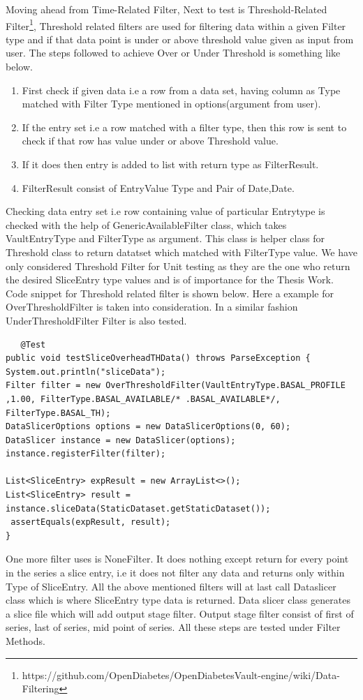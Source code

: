 \documentclass[article,type=msc,colorback,accentcolor=tud9c,twoside,11pt]{tudthesis}
\begin{document}
Moving ahead from Time-Related Filter, Next to test is Threshold-Related Filter\footnote{https://github.com/OpenDiabetes/OpenDiabetesVault-engine/wiki/Data-Filtering}, Threshold related filters are used for filtering data within a given Filter type and if that data point is under or above threshold value given as input from user. The steps followed to achieve Over or Under Threshold is something like below.
\begin{enumerate}
	\item First check if given data i.e a row from a data set, having column as Type matched with Filter Type mentioned in options(argument from user).
	\item If the entry set i.e a row matched with a filter type, then this row is sent to check if that row has value under or above Threshold value.
	\item If it does then entry is added to list with return type as FilterResult.
	\item FilterResult consist of EntryValue Type and Pair of Date,Date.
\end{enumerate}
Checking data entry set i.e row containing value of particular Entrytype is checked with the help of  GenericAvailableFilter class, which takes VaultEntryType and FilterType as argument. This class is helper class for Threshold class to return datatset which  matched with FilterType value. We have only considered Threshold Filter for Unit testing as they are the one who return the desired SliceEntry type values and is of importance for the Thesis Work. Code snippet for Threshold related filter is shown below. Here a example for OverThresholdFilter is taken into consideration. In a similar fashion UnderThresholdFilter Filter is also tested.
\begin{lstlisting}
   @Test
public void testSliceOverheadTHData() throws ParseException {
System.out.println("sliceData");     
Filter filter = new OverThresholdFilter(VaultEntryType.BASAL_PROFILE ,1.00, FilterType.BASAL_AVAILABLE/* .BASAL_AVAILABLE*/, FilterType.BASAL_TH);
DataSlicerOptions options = new DataSlicerOptions(0, 60);
DataSlicer instance = new DataSlicer(options);
instance.registerFilter(filter);

List<SliceEntry> expResult = new ArrayList<>();
List<SliceEntry> result = instance.sliceData(StaticDataset.getStaticDataset());
 assertEquals(expResult, result);
}
\end{lstlisting}
One more filter uses is NoneFilter. It does nothing except return for every point in the series a slice entry, i.e it does not filter any data and returns only within Type of SliceEntry. All the above mentioned filters will at last call Dataslicer class which is where SliceEntry type data is returned. Data slicer class generates a slice file  which will add output stage filter. Output stage filter consist of first of series, last of series, mid point of series. All these steps are tested under Filter Methods.
\end{document}
